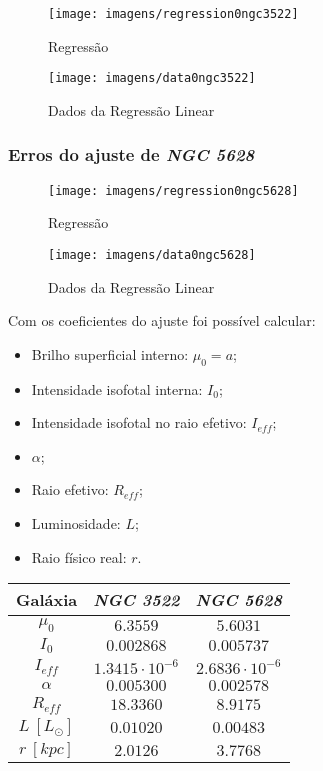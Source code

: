 \documentclass[a4paper, 11pt, fleqn, leqno]{article}
\begin{document}
\begin{figure}[H]
	\centering
	\texttt{[image: imagens/regression0ngc3522]}
	\caption{Regressão}
\end{figure}

\begin{figure}[H]
	\centering
	\texttt{[image: imagens/data0ngc3522]}
	\caption{Dados da Regressão Linear}
\end{figure}

\newpage
\subsubsection{Erros do ajuste de \textit{NGC 5628}}

\begin{figure}[H]
	\centering
	\texttt{[image: imagens/regression0ngc5628]}
	\caption{Regressão}
\end{figure}

\begin{figure}[H]
	\centering
	\texttt{[image: imagens/data0ngc5628]}
	\caption{Dados da Regressão Linear}
\end{figure}

\newpage
\noindent Com os coeficientes do ajuste foi possível calcular: \\

\begin{itemize}
	\item Brilho superficial interno: $\mu_{0} = a$;
	\item Intensidade isofotal interna: $I_{0}$;
	\item Intensidade isofotal no raio efetivo: $I_{eff}$;
	\item $\alpha$;
	\item Raio efetivo: $R_{eff}$;
	\item Luminosidade: $L$;
	\item Raio físico real: $r$.
\end{itemize}

\begin{table}[H]
	\centering
	\begin{tabular}{|c|c|c|}
	\hline 
	\textbf{Galáxia} & \textit{NGC 3522}  & \textit{NGC 5628} \\ 
	\hline 
	$\mu_{0}$ & $6.3559$ & $5.6031$ \\ 
	\hline 
	$I_{0}$ & $0.002868$ & $0.005737$ \\ 
	\hline 
	$I_{eff}$ & $1.3415 \cdot 10^{-6}$ & $2.6836 \cdot 10^{-6}$ \\ 
	\hline 
	$\alpha$ & $0.005300$ & $0.002578$ \\ 
	\hline 
	$R_{eff}$ & $18.3360$ & $8.9175$ \\ 
	\hline 
	$L ~ [L_{\odot}]$ & $0.01020$ & $0.00483$ \\ 
	\hline 
	$r ~ [kpc]$ & $2.0126$ & $3.7768$ \\ 
	\hline 
	\end{tabular} 
\end{table}
\end{document}
